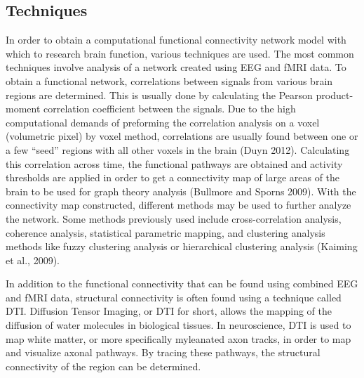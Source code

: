 \documentclass[11pt,letterpaper,doublespacing,titlepage]{article}
\begin{document}

\subsection{Techniques}
\par
In order to obtain a computational functional connectivity network model with which to research brain function, various techniques are used.  The most common techniques involve analysis of a network created using EEG and fMRI data. To obtain a functional network, correlations between signals from various brain regions are determined. This is usually done by calculating the Pearson product-moment correlation coefficient between the signals. Due to the high computational demands of preforming the correlation analysis on a voxel (volumetric pixel) by voxel method, correlations are usually found between one or a few “seed” regions with all other voxels in the brain (Duyn 2012). Calculating this correlation across time, the functional pathways are obtained and activity thresholds are applied in order to get a connectivity map of large areas of the brain to be used for graph theory analysis (Bullmore and Sporns 2009).  With the connectivity map constructed, different methods may be used to further analyze the network. Some methods previously used include cross-correlation analysis, coherence analysis, statistical parametric mapping, and clustering analysis methods like fuzzy clustering analysis or hierarchical clustering analysis (Kaiming et al., 2009).
\par
In addition to the functional connectivity that can be found using combined EEG and fMRI data, structural connectivity is often found using a technique called DTI. Diffusion Tensor Imaging, or DTI for short, allows the mapping of the diffusion of water molecules in biological tissues. In neuroscience, DTI is used to map white matter, or more specifically myleanated axon tracks, in order to map and visualize axonal pathways. By tracing these pathways, the structural connectivity of the region can be determined.
\end{document}
